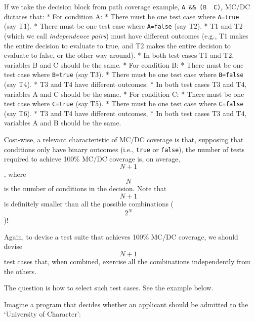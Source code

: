 If we take the decision block from path coverage example,
\texttt{A\ \&\&\ (B\ \textbar{}\textbar{}\ C)}, MC/DC dictates that: *
For condition A: * There must be one test case where \texttt{A=true}
(say T1). * There must be one test case where \texttt{A=false} (say T2).
* T1 and T2 (which we call \emph{independence pairs}) must have
different outcomes (e.g., T1 makes the entire decision to evaluate to
true, and T2 makes the entire decision to evaluate to false, or the
other way around). * In both test cases T1 and T2, variables B and C
should be the same. * For condition B: * There must be one test case
where \texttt{B=true} (say T3). * There must be one test case where
\texttt{B=false} (say T4). * T3 and T4 have different outcomes. * In
both test cases T3 and T4, variables A and C should be the same. * For
condition C: * There must be one test case where \texttt{C=true} (say
T5). * There must be one test case where \texttt{C=false} (say T6). * T3
and T4 have different outcomes, * In both test cases T3 and T4,
variables A and B should be the same.

Cost-wise, a relevant characteristic of MC/DC coverage is that,
supposing that conditions only have binary outcomes (i.e., \texttt{true}
or \texttt{false}), the number of tests required to achieve 100\% MC/DC
coverage is, on average, \[N+1\], where \[N\] is the number of
conditions in the decision. Note that \[N+1\] is definitely smaller than
all the possible combinations (\[2^N\])!

Again, to devise a test suite that achieves 100\% MC/DC coverage, we
should devise \[N+1\] test cases that, when combined, exercise all the
combinations independently from the others.

The question is how to select such test cases. See the example below.

Imagine a program that decides whether an applicant should be admitted
to the `University of Character':

\begin{Shaded}
\begin{Highlighting}[]
 \NormalTok{(}
        \NormalTok{(}\NormalTok{);}
\NormalTok{    \} }\NormalTok{ \{}
        \NormalTok{(}\NormalTok{);}
\NormalTok{    \}}
\NormalTok{\}}
\end{Highlighting}
\end{Shaded}

